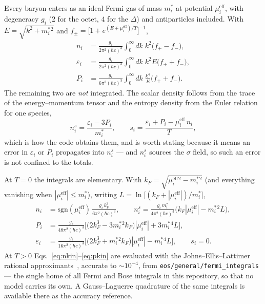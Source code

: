 \documentclass[aps,prc,onecolumn,superscriptaddress,nofootinbib,10pt]{revtex4-2}
\newcommand{\mueff}[1]{\mu^{\mathrm{eff}}_{#1}}
\newcommand{\meff}[1]{m^{*}_{#1}}
\begin{document}
Every baryon enters as an ideal Fermi gas of mass $\meff{i}$ at potential
$\mueff{i}$, with degeneracy $g_i$ ($2$ for the octet, $4$ for the $\Delta$)
and antiparticles included. With $E = \sqrt{k^2 + \meff{i}{}^2}$ and
$f_\pm = \big[ 1 + e^{(E \mp \mueff{i})/T} \big]^{-1}$,
%
\begin{align}
n_i &= \frac{g_i}{2\pi^2 (\hbar c)^3} \int_0^\infty \!\! dk\; k^2
       \big( f_+ - f_- \big) ,
\label{eq:nkin}\\
\varepsilon_i &= \frac{g_i}{2\pi^2 (\hbar c)^3} \int_0^\infty \!\! dk\; k^2 E
       \big( f_+ + f_- \big) ,
\label{eq:ekin}\\
P_i &= \frac{g_i}{6\pi^2 (\hbar c)^3} \int_0^\infty \!\! dk\;
       \frac{k^4}{E} \big( f_+ + f_- \big) .
\label{eq:pkin}
\end{align}
%
The remaining two are \emph{not} integrated. The scalar density follows from
the trace of the energy--momentum tensor and the entropy density from the
Euler relation for one species,
%
\begin{equation}
n^s_i = \frac{\varepsilon_i - 3 P_i}{\meff{i}} ,
\qquad
s_i = \frac{\varepsilon_i + P_i - \mueff{i}\, n_i}{T} ,
\label{eq:nsandS}
\end{equation}
%
which is how the code obtains them, and is worth stating because it means an
error in $\varepsilon_i$ or $P_i$ propagates into $n^s_i$ --- and $n^s_i$
sources the $\sigma$ field, so such an error is not confined to the totals.

At $T = 0$ the integrals are elementary. With
$k_{F} = \sqrt{\mueff{i}{}^2 - \meff{i}{}^2}$ (and everything vanishing when
$|\mueff{i}| \le \meff{i}$), writing $L = \ln\big[(k_F + |\mueff{i}|)/\meff{i}\big]$,
%
\begin{align}
n_i &= \mathrm{sgn}(\mueff{i})\, \frac{g_i\, k_F^3}{6\pi^2 (\hbar c)^3} ,
\qquad
n^s_i = \frac{g_i\, \meff{i}}{4\pi^2 (\hbar c)^3}
        \Big( k_F |\mueff{i}| - \meff{i}{}^2 L \Big) ,
\nonumber\\
P_i &= \frac{g_i}{48\pi^2 (\hbar c)^3}
       \Big[ \big( 2k_F^3 - 3\meff{i}{}^2 k_F \big) |\mueff{i}|
             + 3 \meff{i}{}^4 L \Big] ,
\label{eq:T0}\\
\varepsilon_i &= \frac{g_i}{16\pi^2 (\hbar c)^3}
       \Big[ \big( 2k_F^3 + \meff{i}{}^2 k_F \big) |\mueff{i}|
             - \meff{i}{}^4 L \Big] ,
\qquad s_i = 0 .
\nonumber
\end{align}
%
At $T>0$ Eqs.~\eqref{eq:nkin}--\eqref{eq:pkin} are evaluated with the
Johns--Ellis--Lattimer rational approximants~\cite{JohnsEllisLattimer1996},
accurate to $\sim 10^{-4}$, from
\texttt{eos/general/fermi\_integrals} --- the single home of all Fermi and
Bose integrals in this repository, so that no model carries its own. A
Gauss--Laguerre quadrature of the same integrals is available there as the
accuracy reference.
\end{document}
